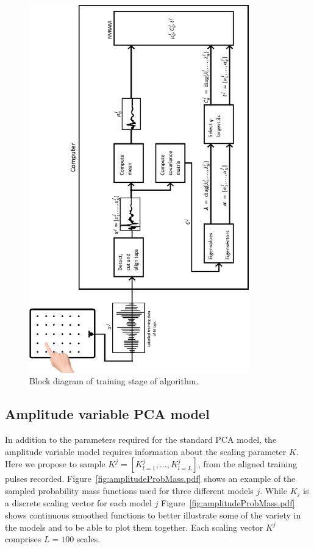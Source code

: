 \begin{figure}[!]
\centering
\includegraphics[width=360px]{trainingsytemRotate.pdf}
\caption{Block diagram of training stage of algorithm.}\label{fig:trainingsytemRotate}
\end{figure}

\subsection{Amplitude variable PCA model}

In addition to the parameters required for the standard PCA model, the amplitude variable model requires information about the scaling parameter $K$. Here we propose to sample $K^j = [K^j_{l=1}, \ldots , K^j_{l=L}]$, from the aligned training pulses recorded. Figure~\ref{fig:amplitudeProbMass.pdf} shows an example of the sampled probability mass functions used for three different models $j$. While $K_j$ is a discrete scaling vector for each model $j$ Figure~\ref{fig:amplitudeProbMass.pdf} shows continuous smoothed functions to better illustrate some of the variety in the models and to be able to plot them together. Each scaling vector $K^j$ comprises $L=100$ scales.

